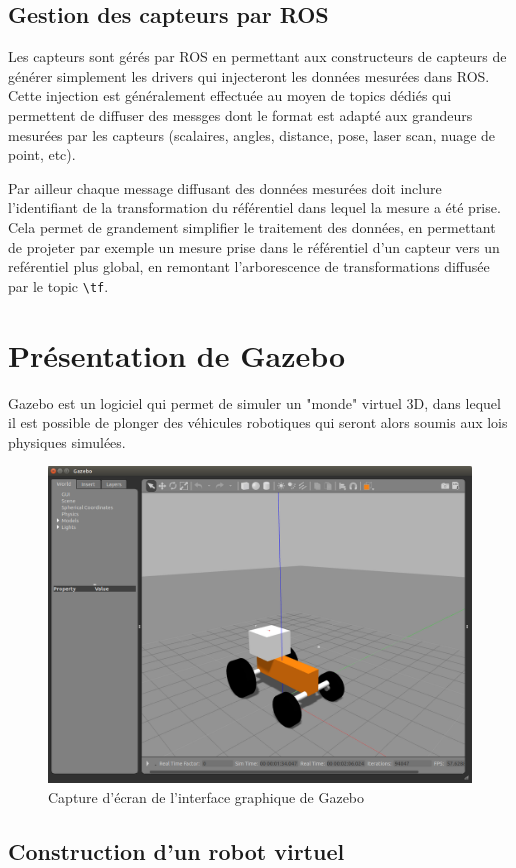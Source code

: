 \documentclass[12pt,a4paper]{report}
\begin{document}
		\subsection{Gestion des capteurs par ROS}
		Les capteurs sont gérés par ROS en permettant aux constructeurs de capteurs de générer simplement les drivers qui injecteront les données mesurées dans ROS. Cette injection est généralement effectuée au moyen de topics dédiés qui permettent de diffuser des messges dont le format est adapté aux grandeurs mesurées par les capteurs (scalaires, angles, distance, pose, laser scan, nuage de point, etc).
		
		\para Par ailleur chaque message diffusant des données mesurées doit inclure l'identifiant de la transformation du référentiel dans lequel la mesure a été prise. Cela permet de grandement simplifier le traitement des données, en permettant de projeter par exemple un mesure prise dans le référentiel d'un capteur vers un reférentiel plus global, en remontant l'arborescence de transformations diffusée par le topic \verb|\tf|. 
		
	\section{Présentation de Gazebo}
	
	Gazebo est un logiciel qui permet de simuler un "monde" virtuel 3D, dans lequel il est possible de plonger des véhicules robotiques qui seront alors soumis aux lois physiques simulées.
		
	\begin{figure}[h!]
		\centering
		\includegraphics[width=0.7\linewidth]{img/gazebo}
		\caption[gazebo]{Capture d'écran de l'interface graphique de Gazebo}
		\label{fig:gazebo}
	\end{figure}
	
		\subsection{Construction d'un robot virtuel}
		
\end{document}
